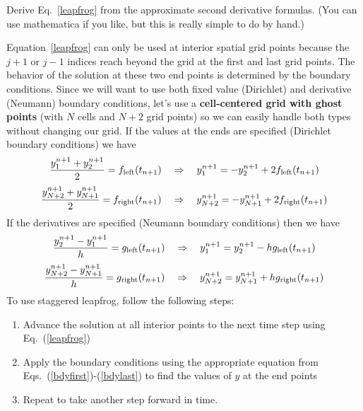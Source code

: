\begin{enumerate}
\probtwo \label{P:13.1} Derive Eq.~\eqref{leapfrog} from the
approximate second derivative formulas. (You can use
mathematica if you like, but this is really simple to do by
hand.)
\end{enumerate}

Equation~\eqref{leapfrog} can only be used at interior spatial
grid points because the $j+1$ or $j-1$ indices reach beyond the
grid at the first and last grid points. The behavior of the
solution at these two end points is determined by the boundary
conditions. Since we will want to use both fixed value
(Dirichlet) and derivative (Neumann) boundary conditions, let's
use a \textbf{cell-centered grid with ghost points} (with $N$ cells and
$N+2$ grid points) so we can easily handle both types without
changing our grid.  If the
values at the ends are specified (Dirichlet boundary
conditions) we have
\begin{equation}
    {y_1^{n+1}+y_2^{n+1} \over 2} = f_\mathrm{left}(t_{n+1})~~~\Rightarrow~~~
    y_1^{n+1}=-y_2^{n+1} + 2 f_\mathrm{left}(t_{n+1})
    \label{bdyfirst}
\end{equation}
\begin{equation}
    {y_{N+2}^{n+1}+y_{N+1}^{n+1} \over 2} = f_\mathrm{right}(t_{n+1})~~~\Rightarrow~~~
    y_{N+2}^{n+1}=-y_{N+1}^{n+1} + 2 f_\mathrm{right}(t_{n+1})
\end{equation}
 If the derivatives are
specified (Neumann boundary conditions) then we have
\begin{equation}
    {y_2^{n+1}-y_1^{n+1} \over h} = g_\mathrm{left}(t_{n+1})~~~\Rightarrow~~~
    y_1^{n+1}=y_2^{n+1} - h g_\mathrm{left}(t_{n+1})
\end{equation}
\begin{equation}
    {y_{N+2}^{n+1}-y_{N+1}^{n+1} \over h} = g_\mathrm{right}(t_{n+1})~~~\Rightarrow~~~
    y_{N+2}^{n+1}=y_{N+1}^{n+1} + h g_\mathrm{right}(t_{n+1})
    \label{bdylast}
\end{equation}
To use staggered leapfrog, follow the following steps:

\begin{enumerate}
\item Advance the solution at all
interior points to the next time step using
Eq.~(\ref{leapfrog})
\item Apply the boundary conditions
using the appropriate equation from
Eqs.~(\ref{bdyfirst})-(\ref{bdylast}) to find the values of $y$
at the end points
\item Repeat to take another step forward in time.
\end{enumerate}

